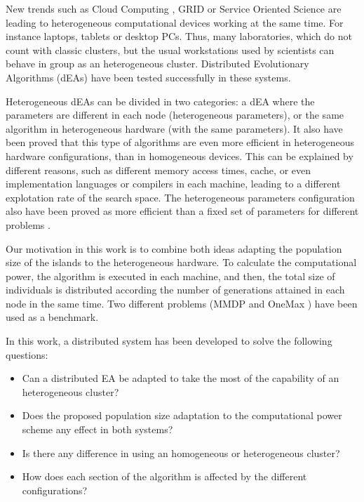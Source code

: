 New trends such as Cloud Computing \cite{CLOUD}, GRID \cite{OPENSCIENCEGRID} or Service Oriented Science \cite{GLOBUS} are leading to heterogeneous computational devices working at the same time. For instance laptops, tablets or desktop PCs. Thus, many laboratories, which do not count with classic clusters, but the usual workstations used by scientists can behave in group as an heterogeneous cluster. Distributed Evolutionary Algorithms (dEAs) \cite{AQUIEN} have been tested successfully in these systems. 

Heterogeneous dEAs can be divided in two categories: a dEA where the parameters are different in each node (heterogeneous parameters), or the same algorithm in heterogeneous hardware (with the same parameters). It also have been proved \cite{HETEROGENEOUSHARD} that this type of algorithms are even more efficient in heterogeneous hardware configurations, than in homogeneous devices. This can be explained by different reasons, such as different memory access times, cache, or even implementation languages or compilers in each machine, leading to a different explotation rate of the search space. The heterogeneous parameters configuration also have been proved as more efficient than a fixed set of parameters for different problems \cite{HETEROGENEOUSPARAMETERS}. 

Our motivation in this work is to combine both ideas adapting the population size of the islands to the heterogeneous hardware. To calculate the computational power, the algorithm is executed in each machine, and then, the total size of individuals is distributed according the number of generations attained in each node in the same time. Two different problems (MMDP \cite{goldberg92massive} and OneMax \cite{ONEMAX}) have been used as a benchmark.


In this work, a distributed system has been developed to solve the following questions:
\begin{itemize}
 \item Can a distributed EA be adapted to take the most of the capability of an heterogeneous cluster?
 \item Does the proposed population size adaptation to the computational power scheme any effect in both systems?
 \item Is there any difference in using an homogeneous or heterogeneous cluster?
 \item How does each section of the algorithm is affected by the different configurations?
\end{itemize}


